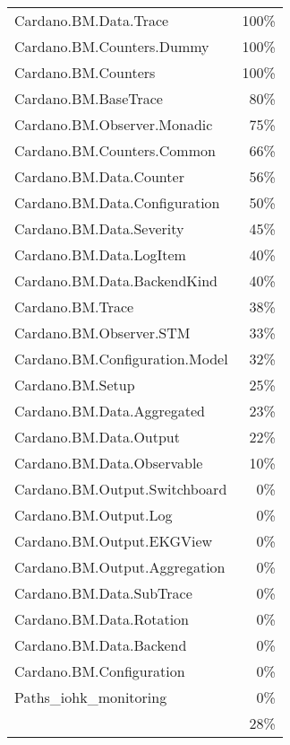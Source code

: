 \begin{tabular}{l r}
   Cardano.BM.Data.Trace & 100\% \\
   Cardano.BM.Counters.Dummy & 100\% \\
   Cardano.BM.Counters & 100\% \\
   Cardano.BM.BaseTrace & 80\% \\
   Cardano.BM.Observer.Monadic & 75\% \\
   Cardano.BM.Counters.Common & 66\% \\
   Cardano.BM.Data.Counter & 56\% \\
   Cardano.BM.Data.Configuration & 50\% \\
   Cardano.BM.Data.Severity & 45\% \\
   Cardano.BM.Data.LogItem & 40\% \\
   Cardano.BM.Data.BackendKind & 40\% \\
   Cardano.BM.Trace & 38\% \\
   Cardano.BM.Observer.STM & 33\% \\
   Cardano.BM.Configuration.Model & 32\% \\
   Cardano.BM.Setup & 25\% \\
   Cardano.BM.Data.Aggregated & 23\% \\
   Cardano.BM.Data.Output & 22\% \\
   Cardano.BM.Data.Observable & 10\% \\
   Cardano.BM.Output.Switchboard & 0\% \\
   Cardano.BM.Output.Log & 0\% \\
   Cardano.BM.Output.EKGView & 0\% \\
   Cardano.BM.Output.Aggregation & 0\% \\
   Cardano.BM.Data.SubTrace & 0\% \\
   Cardano.BM.Data.Rotation & 0\% \\
   Cardano.BM.Data.Backend & 0\% \\
   Cardano.BM.Configuration & 0\% \\
   Paths\_iohk\_monitoring & 0\% \\
    & 28\% \\
\end{tabular}

